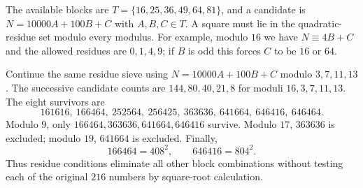 The available blocks are $T=\{16,25,36,49,64,81\}$, and a candidate is $N=10000A+100B+C$ with $A,B,C\in T$. A square must lie in the quadratic-residue set modulo every modulus. For example, modulo $16$ we have $N\equiv4B+C$ and the allowed residues are $0,1,4,9$; if $B$ is odd this forces $C$ to be $16$ or $64$.

Continue the same residue sieve using $N=10000A+100B+C$ modulo $3,7,11,13$. The successive candidate counts are $144,80,40,21,8$ for moduli $16,3,7,11,13$. The eight survivors are
\[
161616,\ 166464,\ 252564,\ 256425,\ 363636,\ 641664,\ 646416,\ 646464.
\]
Modulo $9$, only $166464,363636,641664,646416$ survive. Modulo $17$, $363636$ is excluded; modulo $19$, $641664$ is excluded. Finally,
\[
\boxed{166464=408^2,\qquad646416=804^2}.
\]
Thus residue conditions eliminate all other block combinations without testing each of the original $216$ numbers by square-root calculation.
